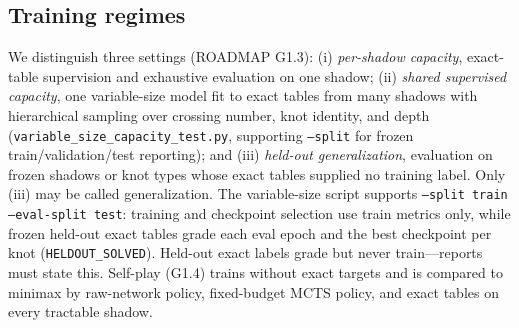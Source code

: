 \subsection{Training regimes}
\label{sec:training}

We distinguish three settings (ROADMAP G1.3): (i) \emph{per-shadow capacity},
exact-table supervision and exhaustive evaluation on one shadow;
(ii) \emph{shared supervised capacity}, one variable-size model fit to exact
tables from many shadows with hierarchical sampling over crossing number, knot
identity, and depth (\texttt{variable\_size\_capacity\_test.py}, supporting
\texttt{--split} for frozen train/validation/test reporting); and
(iii) \emph{held-out generalization}, evaluation on frozen shadows or knot
types whose exact tables supplied no training label. Only (iii) may be called
generalization. The variable-size script supports
\texttt{--split train --eval-split test}: training and checkpoint selection
use train metrics only, while frozen held-out exact tables grade each eval
epoch and the best checkpoint per knot (\texttt{HELDOUT\_SOLVED}). Held-out
exact labels grade but never train---reports must state this.
Self-play (G1.4) trains without exact targets and is compared
to minimax by raw-network policy, fixed-budget MCTS policy, and exact tables
on every tractable shadow.
